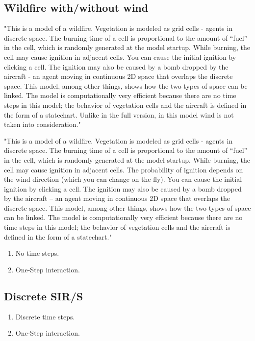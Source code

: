 \documentclass{article}
\begin{document}
\subsection{Wildfire with/without wind}
"This is a model of a wildfire. Vegetation is modeled as grid cells - agents in discrete space. The burning time of a cell is proportional to the amount of “fuel” in the cell, which is randomly generated at the model startup. While burning, the cell may cause ignition in adjacent cells. You can cause the initial ignition by clicking a cell. The ignition may also be caused by a bomb dropped by the aircraft - an agent moving in continuous 2D space that overlaps the discrete space. This model, among other things, shows how the two types of space can be linked. The model is computationally very efficient because there are no time steps in this model; the behavior of vegetation cells and the aircraft is defined in the form of a statechart. Unlike in the full version, in this model wind is not taken into consideration."

"This is a model of a wildfire. Vegetation is modeled as grid cells - agents in discrete space. The burning time of a cell is proportional to the amount of “fuel” in the cell, which is randomly generated at the model startup. While burning, the cell may cause ignition in adjacent cells. The probability of ignition depends on the wind direction (which you can change on the fly). You can cause the initial ignition by clicking a cell. The ignition may also be caused by a bomb dropped by the aircraft – an agent moving in continuous 2D space that overlaps the discrete space. This model, among other things, shows how the two types of space can be linked. The model is computationally very efficient because there are no time steps in this model; the behavior of vegetation cells and the aircraft is defined in the form of a statechart."

\begin{enumerate}
\item No time steps.
\item One-Step interaction.
\end{enumerate}

\subsection{Discrete SIR/S}
\begin{enumerate}
\item Discrete time steps.
\item One-Step interaction.
\end{enumerate}
\end{document}
